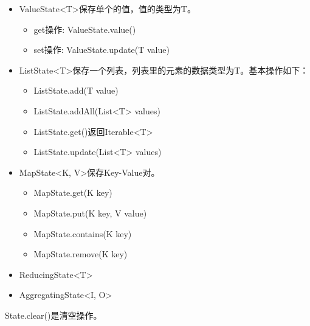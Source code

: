 \documentclass[cn,11pt,chinese]{elegantbook}
\begin{document}
\begin{itemize}
    \item ValueState<T>保存单个的值，值的类型为T。
    \begin{itemize}
        \item get操作: ValueState.value()
        \item set操作: ValueState.update(T value)
    \end{itemize}
    \item ListState<T>保存一个列表，列表里的元素的数据类型为T。基本操作如下：
    \begin{itemize}
        \item ListState.add(T value)
        \item ListState.addAll(List<T> values)
        \item ListState.get()返回Iterable<T>
        \item ListState.update(List<T> values)
    \end{itemize}
    \item MapState<K, V>保存Key-Value对。
    \begin{itemize}
        \item MapState.get(K key)
        \item MapState.put(K key, V value)
        \item MapState.contains(K key)
        \item MapState.remove(K key)
    \end{itemize}
    \item ReducingState<T>
    \item AggregatingState<I, O>
\end{itemize}

State.clear()是清空操作。
\end{document}

